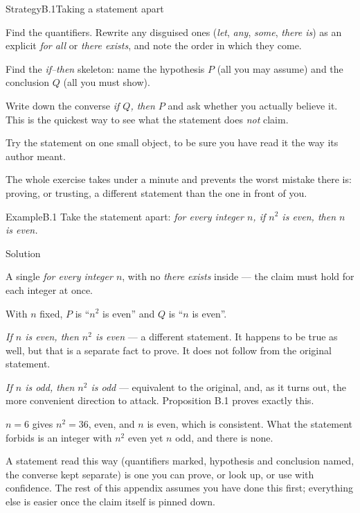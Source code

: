 \documentclass[a4paper,12pt,oneside]{memoir}
\begin{document}
\begin{envstrategy}{Strategy}{B.1}{Taking a statement apart}
\begin{steps}
  \item Find the quantifiers. Rewrite any disguised ones (\emph{let}, \emph{any}, \emph{some}, \emph{there is}) as an explicit \emph{for all} or \emph{there exists}, and note the order in which they come.
  \item Find the \emph{if–then} skeleton: name the hypothesis \(P\) (all you may assume) and the conclusion \(Q\) (all you must show).
  \item Write down the converse \emph{if \(Q\), then \(P\)} and ask whether you actually believe it. This is the quickest way to see what the statement does \emph{not} claim.
  \item Try the statement on one small object, to be sure you have read it the way its author meant.
\end{steps}
\begin{informal}
The whole exercise takes under a minute and prevents the worst mistake there is: proving, or trusting, a different statement than the one in front of you.
\end{informal}
\end{envstrategy}
\begin{workedexample}
\begin{envexample}{Example}{B.1}{}
Take the statement apart: \emph{for every integer \(n\), if \(n^{2}\) is even, then \(n\) is even.}
\end{envexample}
\begin{envsolution}{Solution}{}{}
\begin{sollist}
  \item {} A single \emph{for every integer \(n\)}, with no \emph{there exists} inside — the claim must hold for each integer at once.
  \item {} With \(n\) fixed, \(P\) is “\(n^{2}\) is even” and \(Q\) is “\(n\) is even”.
  \item {} \emph{If \(n\) is even, then \(n^{2}\) is even} — a different statement. It happens to be true as well, but that is a separate fact to prove. It does not follow from the original statement.
  \item {} \emph{If \(n\) is odd, then \(n^{2}\) is odd} — equivalent to the original, and, as it turns out, the more convenient direction to attack. Proposition B.1 proves exactly this.
  \item {} \(n = 6\) gives \(n^{2} = 36\), even, and \(n\) is even, which is consistent. What the statement forbids is an integer with \(n^{2}\) even yet \(n\) odd, and there is none.
\end{sollist}
\end{envsolution}
\end{workedexample}
A statement read this way (quantifiers marked, hypothesis and conclusion named, the converse kept separate) is one you can prove, or look up, or use with confidence. The rest of this appendix assumes you have done this first; everything else is easier once the claim itself is pinned down.
\end{document}
